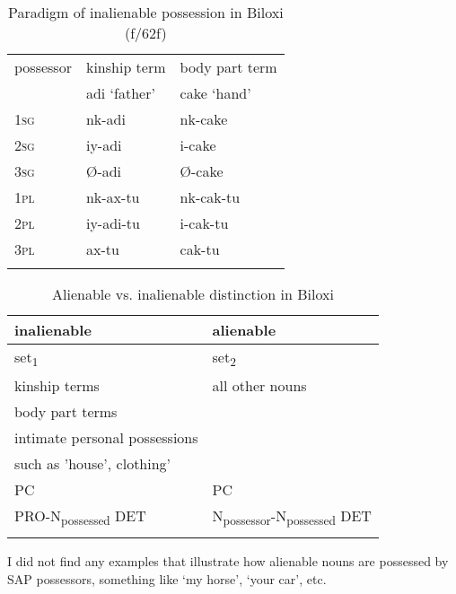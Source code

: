 \documentclass[output=paper]{LSP/langsci}
\begin{document}
\begin{table}
\caption{Paradigm of inalienable possession in Biloxi (\citealt[57]{Einaudi1976}f/62f)} \label{biloxiparadigm}
\begin{tabular}{l l l }
\lsptoprule
possessor	& kinship term & body part term \\
& adi `father' & cake `hand' \\
\midrule
 
\textsc{1sg} & nk-adi	& nk-cake \\
 
\textsc{2sg} & iy-adi & i-cake \\
 
\textsc{3sg} & Ø-adi & Ø-cake \\
 
\textsc{1pl} & nk-ax-tu & nk-cak-tu \\
 
\textsc{2pl} & iy-adi-tu & i-cak-tu \\
 
\textsc{3pl} & ax-tu & cak-tu \\
\lspbottomrule
\end{tabular}
\end{table}

\begin{table}
\caption{Alienable vs. inalienable distinction in Biloxi} \label{biloxialienability}
\begin{tabular}{ l l }
\lsptoprule
inalienable & alienable \\
\midrule
set\textsubscript{1} & set\textsubscript{2} \\
\midrule
kinship terms & all other nouns \\
body part terms &  \\
intimate personal possessions & \\
such as 'house', clothing' & \\	
\midrule
PC &	PC \\
\midrule
PRO-N\textsubscript{possessed} DET & N\textsubscript{possessor}-N\textsubscript{possessed} DET \\
\lspbottomrule
\end{tabular}
\end{table}

I did not find any examples that illustrate how alienable nouns are possessed by SAP possessors, something like `my horse', `your car', etc.
\end{document}
